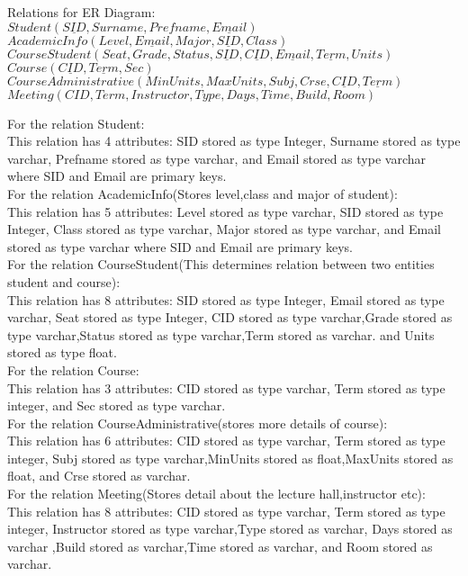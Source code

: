 Relations for ER Diagram:\\
$Student(\underline{SID}, Surname, Prefname, \underline{Email})$\\
$AcademicInfo(Level, \underline{Email}, Major, \underline{SID}, Class)$\\
$CourseStudent(Seat, Grade, Status, \underline{SID}, \underline{CID}, \underline{Email}, \underline{Term}, Units)$\\
$Course(\underline{CID}, \underline{Term}, Sec)$\\
$CourseAdministrative(MinUnits, MaxUnits, Subj, Crse, \underline{CID}, \underline{Term})$\\
$Meeting(CID, Term, Instructor, Type, Days, Time, Build, Room)$
 
 
 For the relation Student:\\
  This relation has 4 attributes: SID stored as type Integer, Surname stored as type varchar, Prefname stored as type varchar, and Email stored as type varchar where SID and Email are primary keys.\\
  
 For the relation AcademicInfo(Stores level,class and major of student):\\
  This relation has 5 attributes: Level stored as type varchar, SID stored as type Integer, Class stored as type varchar, Major stored as type varchar, and Email stored as type varchar where SID and Email are primary keys.\\
  
 For the relation CourseStudent(This determines relation between two entities student and course):\\
  This relation has 8 attributes:  SID stored as type Integer, Email stored as type varchar, Seat stored as type Integer, CID stored as type varchar,Grade stored as type varchar,Status stored as type varchar,Term stored as varchar. and Units stored as type float.\\
  
 For the relation Course:\\
 This relation has 3 attributes: CID stored as type varchar, Term stored as type integer, and Sec stored as type varchar.\\
 
 For the relation CourseAdministrative(stores more details of course):\\
 This relation has 6 attributes: CID stored as type varchar, Term stored as type integer, Subj stored as type varchar,MinUnits stored as float,MaxUnits stored as float, and Crse stored as varchar.\\
  
 
  For the relation Meeting(Stores detail about the lecture hall,instructor etc):\\
 This relation has 8 attributes: CID stored as type varchar, Term stored as type integer, Instructor stored as type varchar,Type stored as varchar, Days stored as varchar ,Build stored as varchar,Time stored as varchar, and Room stored as varchar.\\
 
